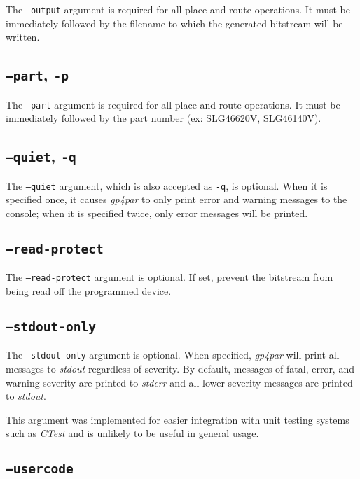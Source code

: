 \documentclass[11pt]{article}
\newcommand{\namestyle}[1]{\textit{#1}}
\begin{document}
The \texttt{--output} argument is required for all place-and-route operations. It must be immediately followed by the
filename to which the generated bitstream will be written.

\subsection{\texttt{--part}, \texttt{-p}}

The \texttt{--part} argument is required for all place-and-route operations. It must be immediately followed by the
part number (ex: SLG46620V, SLG46140V).

\subsection{\texttt{--quiet}, \texttt{-q}}

The \texttt{--quiet} argument, which is also accepted as \texttt{-q}, is optional. When it is specified once, it
causes \namestyle{gp4par} to only print error and warning messages to the console; when it is specified twice,
only error messages will be printed.

\subsection{\texttt{--read-protect}}

The \texttt{--read-protect} argument is optional. If set, prevent the bitstream from being read off the programmed
device.

\subsection{\texttt{--stdout-only}}

The \texttt{--stdout-only} argument is optional. When specified, \namestyle{gp4par} will print all messages to
\namestyle{stdout} regardless of severity. By default, messages of fatal, error, and warning severity are printed to
\namestyle{stderr} and all lower severity messages are printed to \namestyle{stdout}.

This argument was implemented for easier integration with unit testing systems such as \namestyle{CTest} and is
unlikely to be useful in general usage.

\subsection{\texttt{--usercode}}
\end{document}
